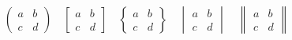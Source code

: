 \[ \begin{pmatrix} a&b\\c&d \end{pmatrix} \quad
    \begin{bmatrix} a&b\\c&d \end{bmatrix} \quad
    \begin{Bmatrix} a&b\\c&d \end{Bmatrix} \quad
    \begin{vmatrix} a&b\\c&d \end{vmatrix} \quad
    \begin{Vmatrix} a&b\\c&d \end{Vmatrix} \]
